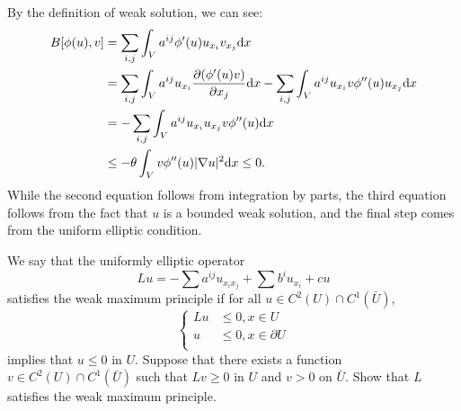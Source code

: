 \begin{solution}
    By the definition of weak solution, we can see:
    \begin{equation}
        \begin{aligned}
            B[\phi(u),v]&=\sum_{i,j}\int_{V}a^{ij}\phi'(u)u_{x_{i}}v_{x_{j}}\mathrm{d} x\\
            &=\sum_{i,j}\int_{V}a^{ij}u_{x_{i}}\frac{\partial (\phi'(u)v)}{\partial x_{j}}\mathrm{d} x-\sum_{i,j}\int_{V}a^{ij}u_{x_{i}}v\phi''(u)u_{x_{j}}\mathrm{d} x\\
            &=-\sum_{i,j}\int_{V}a^{ij}u_{x_{i}}u_{x_{j}}v\phi''(u)\mathrm{d} x\\
            &\le-\theta\int_{V}v\phi''(u)|\nabla u|^{2}\mathrm{d} x\le 0.
        \end{aligned}
    \end{equation}
While the second equation follows from integration by parts, the third equation follows from the fact that $u$ is a bounded weak solution, and the final step comes from the uniform elliptic condition.
\end{solution}
\begin{exercise}
We say that the uniformly elliptic operator 
\begin{equation}
    Lu=-\sum a^{ij}u_{x_{i}x_{j}}+\sum b^{i}u_{x_{i}}+cu
\end{equation}
satisfies the weak maximum principle if for all $u\in C^{2}(U)\cap C^{1}(\bar{U})$, 
\begin{equation}
    \left\{
        \begin{aligned}
            Lu&\le 0,x\in U\\
            u&\le 0,x\in\partial U\\
        \end{aligned}
    \right.
\end{equation}
implies that $u\le 0$ in $U$. Suppose that there exists a function $v\in C^{2}(U)\cap C^{1}(\bar{U})$ such that $Lv\ge 0$ in $U$ and $v>0$ on $\bar{U}$. Show that $L$ satisfies the weak maximum principle.
\end{exercise}
